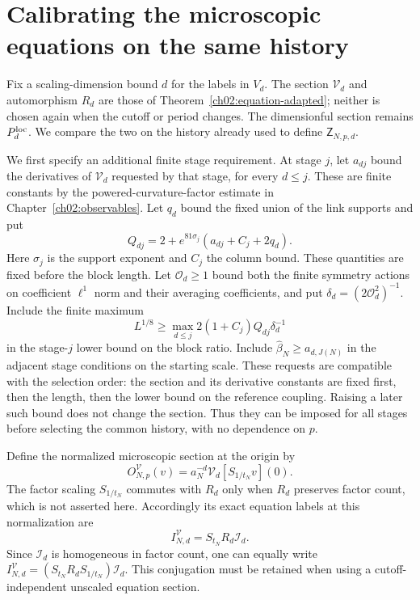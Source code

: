 \section{Calibrating the microscopic equations on the same history}
\label{ch11:equation-calibration}

Fix a scaling-dimension bound $d$ for the labels in $V_d$. The section $\mathcal V_d$ and automorphism $R_d$
are those of Theorem~\ref{ch02:equation-adapted}; neither is chosen
again when the cutoff or period changes. The dimensionful section remains
$P_d^{\rm loc}$. We compare the two on the history already used to
define $\mathsf Z_{N,p,d}$.

We first specify an additional finite stage requirement.
At stage $j$, let $a_{dj}$ bound the derivatives of $\mathcal V_d$
requested by that stage, for every $d\le j$. These are finite constants
by the powered-curvature-factor estimate in Chapter~\ref{ch02:observables}.
Let $q_d$ bound the fixed union of the link supports and put
\[
 Q_{dj}=2+e^{81\sigma_j}(a_{dj}+C_j+2q_d).
\]
Here $\sigma_j$ is the support exponent and $C_j$ the column bound.
These quantities are fixed before the block length.
Let $\mathcal O_d\ge1$ bound both the finite symmetry actions on
coefficient $\ell^1$ norm and their averaging coefficients, and put
$\delta_d=(2\mathcal O_d^2)^{-1}$. Include the finite maximum
\begin{equation}
 L^{1/8}\ge
 \max_{d\le j}2(1+C_j)Q_{dj}\delta_d^{-1}
 \label{ch11:calibration-floor}
\end{equation}
in the stage-$j$ lower bound on the block ratio. Include
$\widehat\beta_N\ge a_{d,J(N)}$ in the adjacent stage conditions on the starting scale. These requests are compatible with the selection order:
the section and its derivative constants are fixed first, then the
length, then the lower bound on the reference coupling. Raising a later such bound does
not change the section. Thus they can be imposed for all stages
before selecting the common history, with no dependence on $p$.

Define the normalized microscopic section at the origin by
\[
 O^{\mathcal V}_{N,p}(v)
   =a_N^{-d}\mathcal V_d[S_{1/t_N}v](0).
\]
The factor scaling $S_{1/t_N}$ commutes with $R_d$ only when
$R_d$ preserves factor count, which is not asserted here.
Accordingly its exact equation labels at this normalization are
\begin{equation}
 I_{N,d}^{\mathcal V}
    =S_{t_N}R_d\mathcal I_d.
 \label{ch11:scaled-equation-labels}
\end{equation}
Since $\mathcal I_d$ is homogeneous in factor count, one can equally
write $I_{N,d}^{\mathcal V}=
(S_{t_N}R_dS_{1/t_N})\mathcal I_d$.
This conjugation must be retained when using a cutoff-independent
unscaled equation section.

